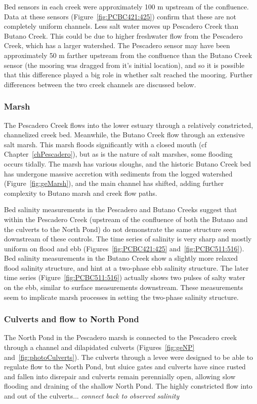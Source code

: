 Bed sensors in each creek were approximately 100 m upstream of the confluence. Data at these sensors (Figure~\ref{fig:PCBC421:425}) confirm that these are not completely uniform channels. Less salt water moves up Pescadero Creek than Butano Creek. This could be due to higher freshwater flow from the Pescadero Creek, which has a larger watershed. The Pescadero sensor may have been approximately 50 m farther upstream from the confluence than the Butano Creek sensor (the mooring was dragged from it's initial location), and so it is possible that this difference played a big role in whether salt reached the mooring. Further differences between the two creek channels are discussed below.

\subsubsection{Marsh}
The Pescadero Creek flows into the lower estuary through a relatively constricted, channelized creek bed.  Meanwhile, the Butano Creek flow through an extensive salt marsh. This marsh floods significantly with a closed mouth (cf Chapter~\ref{chPescadero}), but as is the nature of salt marshes, some flooding occurs tidally. The marsh has various sloughs, and the historic Butano Creek bed has undergone massive accretion with sediments from the logged watershed (Figure~\ref{fig:geMarsh}), and the main channel has shifted, adding further complexity to Butano marsh and creek flow paths.

Bed salinity measurements in the Pescadero and Butano Creeks suggest that within the Pescadero Creek (upstream of the confluence of both the Butano and the culverts to the North Pond) do not demonstrate the same structure seen downstream of these controls. The time series of salinity is very sharp and mostly uniform on flood and ebb (Figures~\ref{fig:PCBC421:425} and~\ref{fig:PCBC511:516}). Bed salinity measurements in the Butano Creek show a slightly more relaxed flood salinity structure, and hint at a two-phase ebb salinity structure. The later time series (Figure~\ref{fig:PCBC511:516}) actually shows two pulses of salty water on the ebb, similar to surface measurements downstream. These measurements seem to implicate marsh processes in setting the two-phase salinity structure.

\subsubsection{Culverts and flow to North Pond}
The North Pond in the Pescadero marsh is connected to the Pescadero creek through a channel and dilapidated culverts (Figures~\ref{fig:geNP} and~\ref{fig:photoCulverts}). The culverts through a levee were designed to be able to regulate flow to the North Pond, but sluice gates and culverts have since rusted and fallen into disrepair and culverts remain perennially open, allowing slow flooding and draining of the shallow North Pond. The highly constricted flow into and out of the culverts... \emph{connect back to observed salinity}

